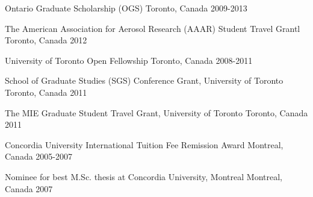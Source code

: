




\begin{cvhonors}


\cvhonor
{} %
{Ontario Graduate Scholarship (OGS)} %
{Toronto, Canada} %
{2009-2013} %


\cvhonor
{} %
{The American Association for Aerosol Research (AAAR) Student Travel Grantl} %
{Toronto, Canada} %
{2012} %


\cvhonor
{} %
{University of Toronto Open Fellowship} %
{Toronto, Canada} %
{2008-2011} %


\cvhonor
{} %
{School of Graduate Studies (SGS) Conference Grant, University of Toronto} %
{Toronto, Canada} %
{2011} %


\cvhonor
{} %
{The MIE Graduate Student Travel Grant, University of Toronto} %
{Toronto, Canada} %
{2011} %


\cvhonor
{} %
{Concordia University International Tuition Fee Remission Award} %
{Montreal, Canada} %
{2005-2007} %


\cvhonor
{} %
{Nominee for best M.Sc. thesis at Concordia University, Montreal} %
{Montreal, Canada} %
{2007} %


\end{cvhonors}

